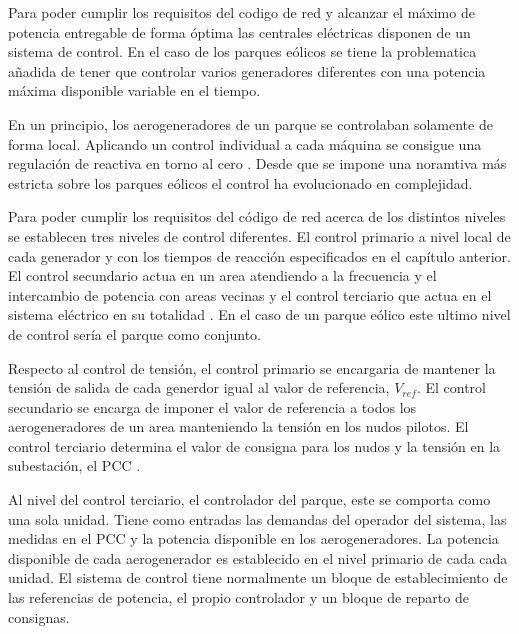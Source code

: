 \documentclass{book}
\begin{document}
Para poder cumplir los requisitos del codigo de red y alcanzar el m\'aximo de potencia entregable de forma \'optima las centrales el\'ectricas disponen de un sistema de control. En el caso de los parques e\'olicos se tiene la problematica añadida de tener que controlar varios generadores diferentes con una potencia m\'axima disponible variable en el tiempo. \par

En un principio, los aerogeneradores de un parque se controlaban solamente de forma local. Aplicando un control individual a cada m\'aquina se consigue una regulaci\'on de reactiva en torno al cero \cite{PI_QV}. Desde que se impone una noramtiva m\'as estricta sobre los parques e\'olicos el control ha evolucionado en complejidad. \par

Para poder cumplir los requisitos del c\'odigo de red acerca de los distintos niveles se establecen tres niveles de control diferentes. El control primario a nivel local de cada generador y con los tiempos de reacci\'on especificados en el cap\'itulo anterior. El control secundario actua en un area atendiendo a la frecuencia y el intercambio de potencia con areas vecinas y el control terciario que actua en el sistema el\'ectrico en su totalidad \cite{NivelesDeControl}. En el caso de un parque e\'olico este ultimo nivel de control ser\'ia el parque como conjunto. \par

Respecto al control de tensi\'on, el control primario se encargaria de mantener la tensi\'on de salida de cada generdor igual al valor de referencia, $V_{ref}$. El control secundario se encarga de imponer el valor de referencia a todos los aerogeneradores de un area manteniendo la tensi\'on en los nudos pilotos. El control terciario determina el valor de consigna para los nudos y la tensi\'on en la subestaci\'on, el PCC \cite{ControlCentrales}. \par

Al nivel del control terciario, el controlador del parque, este se comporta como una sola unidad. Tiene como entradas las demandas del operador del sistema, las medidas en el PCC y la potencia disponible en los aerogeneradores. La potencia disponible de cada aerogenerador es establecido en el nivel primario de cada cada unidad. El sistema de control tiene normalmente un bloque de establecimiento de las referencias de potencia, el propio controlador y un bloque de reparto de consignas\cite{DankControl}. \par
\end{document}
